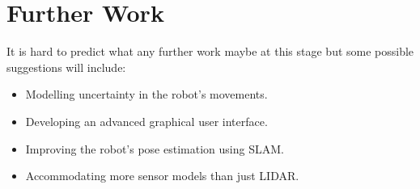 \chapter{Further Work}


It is hard to predict what any further work maybe at this stage but some possible suggestions will include:

\begin{itemize}
\item Modelling uncertainty in the robot's movements.
\item Developing an advanced graphical user interface.
\item Improving the robot's pose estimation using SLAM.
\item Accommodating more sensor models than just LIDAR.
\end{itemize}